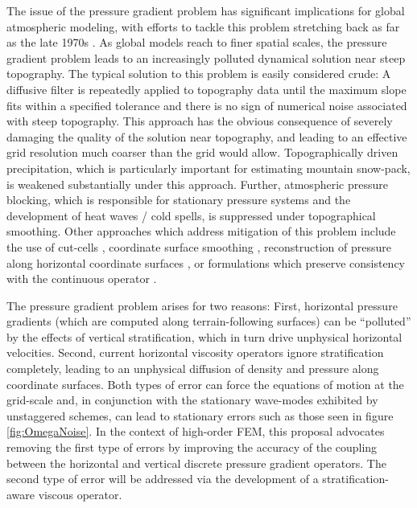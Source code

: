 \documentclass[11pt]{article}
\begin{document}
The issue of the pressure gradient problem has significant implications for global atmospheric modeling, with efforts to tackle this problem stretching back as far as the late 1970s \citep{ZIJ1977BzPdA, DTMZIJ1986MAP}.  As global models reach to finer spatial scales, the pressure gradient problem leads to an increasingly polluted dynamical solution near steep topography.  The typical solution to this problem is easily considered crude:  A diffusive filter is repeatedly applied to topography data until the maximum slope fits within a specified tolerance and there is no sign of numerical noise associated with steep topography.  This approach has the obvious consequence of severely damaging the quality of the solution near topography, and leading to an effective grid resolution much coarser than the grid would allow.  Topographically driven precipitation, which is particularly important for estimating mountain snow-pack, is weakened substantially under this approach.  Further, atmospheric pressure blocking, which is responsible for stationary pressure systems and the development of heat waves / cold spells, is suppressed under topographical smoothing.  Other approaches which address mitigation of this problem include the use of cut-cells \citep{JSSHPAD2013GMDD}, coordinate surface smoothing \citep{JBK2011MWR}, reconstruction of pressure along horizontal coordinate surfaces \cite{GZ2012MWR}, or formulations which preserve consistency with the continuous operator \citep{SJL1997QJRMS}.

The pressure gradient problem arises for two reasons:  First, horizontal pressure gradients (which are computed along terrain-following surfaces) can be ``polluted'' by the effects of vertical stratification, which in turn drive unphysical horizontal velocities.  Second, current horizontal viscosity operators \citep{dennis2011cam} ignore stratification completely, leading to an unphysical diffusion of density and pressure along coordinate surfaces.  Both types of error can force the equations of motion at the grid-scale and, in conjunction with the stationary wave-modes exhibited by unstaggered schemes, can lead to stationary errors such as those seen in figure \ref{fig:OmegaNoise}.  In the context of high-order FEM, this proposal advocates removing the first type of errors by improving the accuracy of the coupling between the horizontal and vertical discrete pressure gradient operators.  The second type of error will be addressed via the development of a stratification-aware viscous operator.


\end{document}
